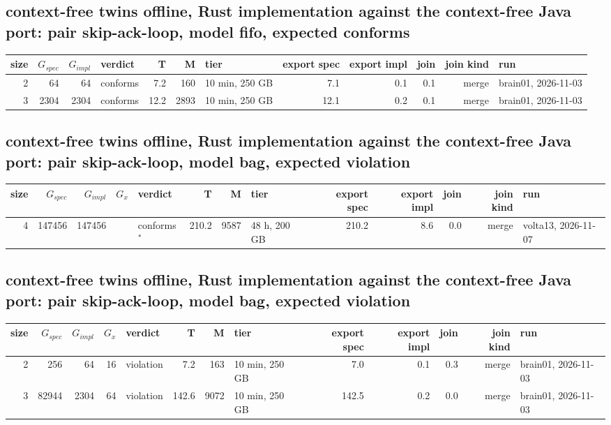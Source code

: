 \documentclass[10pt]{article}
\begin{document}
\subsection*{context-free twins offline, Rust implementation against the context-free Java port: pair \textsf{skip-ack-loop}, model fifo, expected conforms}
\begin{longtable}{@{}rrrlrrlrrrrl@{}}
\toprule
size & $G_{\mathit{spec}}$ & $G_{\mathit{impl}}$ & verdict & T & M & tier & export spec & export impl & join & join kind & run \\
\midrule
\endhead
\color{blue} 2 & 64 & 64 & conforms & 7.2 & 160 & 10 min, 250 GB & 7.1 & 0.1 & 0.1 & merge & brain01, 2026-11-03 \\
\color{blue} 3 & 2304 & 2304 & conforms & 12.2 & 2893 & 10 min, 250 GB & 12.1 & 0.2 & 0.1 & merge & brain01, 2026-11-03 \\
\bottomrule
\end{longtable}
\subsection*{context-free twins offline, Rust implementation against the context-free Java port: pair \textsf{skip-ack-loop}, model bag, expected violation}
\begin{longtable}{@{}rrrrlrrlrrrrl@{}}
\toprule
size & $G_{\mathit{spec}}$ & $G_{\mathit{impl}}$ & $G_x$ & verdict & T & M & tier & export spec & export impl & join & join kind & run \\
\midrule
\endhead
\color{red} 4 & 147456 & 147456 &  & conforms$^{\ast}$ & 210.2 & 9587 & 48 h, 200 GB & 210.2 & 8.6 & 0.0 & merge & volta13, 2026-11-07 \\
\bottomrule
\end{longtable}
\subsection*{context-free twins offline, Rust implementation against the context-free Java port: pair \textsf{skip-ack-loop}, model bag, expected violation}
\begin{longtable}{@{}rrrrlrrlrrrrl@{}}
\toprule
size & $G_{\mathit{spec}}$ & $G_{\mathit{impl}}$ & $G_x$ & verdict & T & M & tier & export spec & export impl & join & join kind & run \\
\midrule
\endhead
\color{blue} 2 & 256 & 64 & 16 & violation & 7.2 & 163 & 10 min, 250 GB & 7.0 & 0.1 & 0.3 & merge & brain01, 2026-11-03 \\
\color{blue} 3 & 82944 & 2304 & 64 & violation & 142.6 & 9072 & 10 min, 250 GB & 142.5 & 0.2 & 0.0 & merge & brain01, 2026-11-03 \\
\bottomrule
\end{longtable}
\end{document}
